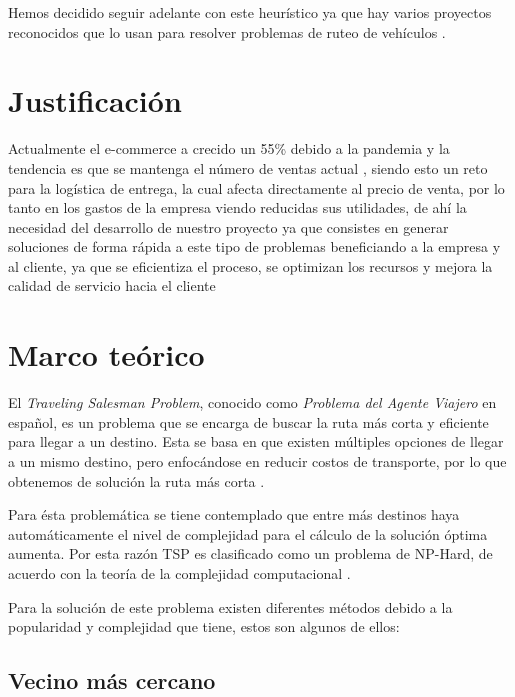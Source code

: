 \documentclass[journal]{IEEEtran}
\begin{document}
        Hemos decidido seguir adelante con este heurístico ya que hay varios proyectos reconocidos que lo usan para resolver problemas de ruteo de vehículos \cite{ERDOGAN201762}.

    \section{Justificación} \label{sec:justification}

        Actualmente el e-commerce a crecido un 55\% debido a la pandemia y la tendencia es que se mantenga el número de ventas actual \cite{koetsier-2022}, siendo esto un reto para la logística de entrega, la cual afecta directamente al precio de venta, por lo tanto en los gastos de la empresa viendo reducidas sus utilidades, de ahí la necesidad del desarrollo de nuestro proyecto ya que consistes en generar soluciones de forma rápida a este tipo de problemas beneficiando a la empresa y al cliente, ya que se eficientiza el proceso, se optimizan los recursos y mejora la calidad de servicio hacia el cliente

    \section{Marco teórico} \label{sec:theoretical}
    
        El \emph{Traveling Salesman Problem}, conocido como \emph{Problema del Agente Viajero} en español, es un problema que se encarga de buscar la ruta más corta y eficiente para llegar a un destino. Esta se basa en que existen múltiples opciones de llegar a un mismo destino, pero enfocándose en reducir costos de transporte, por lo que obtenemos de solución la ruta más corta \cite{trevelingProb}.

        Para ésta problemática se tiene contemplado que entre más destinos haya automáticamente el nivel de complejidad para el cálculo de la solución óptima aumenta. Por esta razón TSP es clasificado como un problema de NP-Hard, de acuerdo con la teoría de la complejidad computacional \cite{trevelingProb}.

        Para la solución de este problema existen diferentes métodos debido a la popularidad y complejidad que tiene, estos son algunos de ellos:
        
        \subsection{Vecino más cercano}
        
\end{document}
